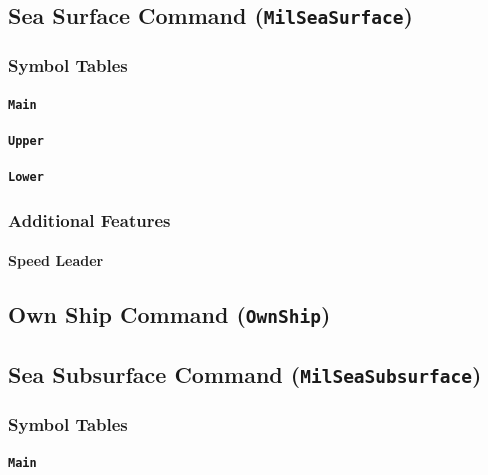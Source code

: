 \documentclass[a4paper, titlepage]{article}
\begin{document}
\subsection{Sea Surface Command (\textbf{\texttt{MilSeaSurface}})}

\subsubsection{Symbol Tables}

\paragraph{\texttt{Main}}

\paragraph{\texttt{Upper}}

\paragraph{\texttt{Lower}}

\subsubsection{Additional Features}

\paragraph{Speed Leader}

\subsection{Own Ship Command (\textbf{\texttt{OwnShip}})}

\subsection{Sea Subsurface Command (\textbf{\texttt{MilSeaSubsurface}})}

\subsubsection{Symbol Tables}

\paragraph{\texttt{Main}}
\end{document}
